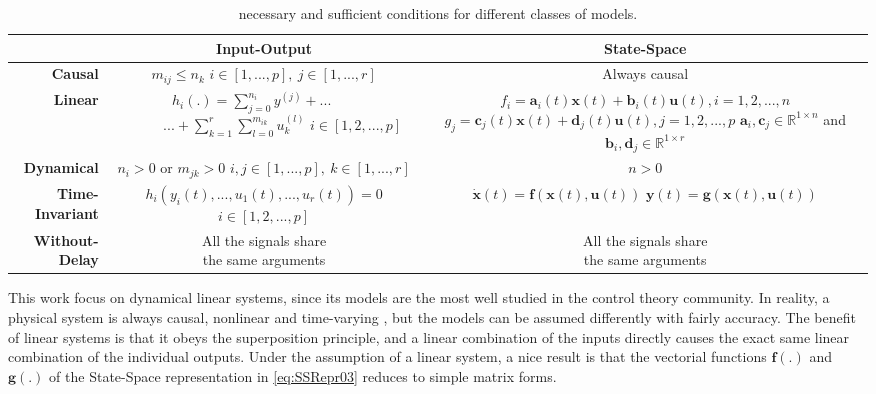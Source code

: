 \documentclass[a4paper,11pt]{book}
\numberwithin{figure}{chapter}
\numberwithin{equation}{chapter}
\numberwithin{table}{chapter}
\theoremstyle{definition}
\begin{document}
\begin{table}[!ht]
	\centering
	\begin{tabular}{r | c | c }
	 & \textbf{Input-Output} & \textbf{State-Space} \\
	\hline 
		\textbf{Causal}			& \makecell{$m_{ij} \leq n_k$\\$i \in [1,..., p],\ j \in [1,...,r]$} & Always causal \\
	\hline 
		\textbf{Linear}			& \makecell{$h_i(.) = \sum_{j=0}^{n_i} y^{(j)} + ... \ \ \ \ \ \ \ \ $\\$ \ \ \ \ \ \ \ \ \ \ \ \ ... + \sum_{k=1}^{r} \sum_{l=0}^{m_{ik}} u_k^{(l)}$\\$i \in [1,2,...,p]$} & \makecell{$f_i = \bm{a}_i(t) \bm{x}(t) + \bm{b}_i(t) \bm{u}(t), i = 1,2,...,n$ \\ $g_j = \bm{c}_j(t) \bm{x}(t) + \bm{d}_j(t) \bm{u}(t), j = 1,2,...,p$ \\ $\bm{a}_i,\bm{c}_j \in \mathbb{R}^{1 \times n}$ and $\bm{b}_i, \bm{d}_j \in \mathbb{R}^{1 \times r}$} \\
	\hline 
		\textbf{Dynamical}		& \makecell{$n_i > 0$ or $m_{jk} > 0$\\$i, j \in [1,...,p],\ k \in [1,...,r]$} & $n > 0$ \\
	\hline 
		\textbf{Time-Invariant}	& \makecell{$h_i(y_i(t),...,u_1(t),...,u_r(t)) = 0$\\$i \in  [1,2,...,p]$} & \makecell{$\dot{\bm{x}}(t) = \bm{f}(\bm{x}(t), \bm{u}(t))$ \\ $\bm{y}(t) = \bm{g}(\bm{x}(t), \bm{u}(t))$} \\
	\hline 
		\textbf{Without-Delay}	& \makecell{All the signals share\\the same arguments} & \makecell{All the signals share\\the same arguments} \\
	\end{tabular} 
	\caption{necessary and sufficient conditions for different classes of models.}
	\label{table:classes01}	
\end{table} 

This work focus on dynamical linear systems, since its models are the most well studied in the control theory community. In reality, a physical system is always causal, nonlinear and time-varying \cite{Vidyasagar:2002}, but the models can be assumed differently with fairly accuracy. The benefit of linear systems is that it obeys the superposition principle, and a linear combination of the inputs directly causes the exact same linear combination of the individual outputs. Under the assumption of a linear system, a nice result is that the vectorial functions $\bm{f}(.)$ and $\bm{g}(.)$ of the State-Space representation in \eqref{eq:SSRepr03} reduces to simple matrix forms.
\end{document}
